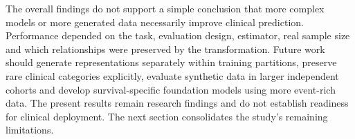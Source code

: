The overall findings do not support a simple conclusion that more complex
models or more generated data necessarily improve clinical prediction.
Performance depended on the task, evaluation design, estimator, real sample
size and which relationships were preserved by the transformation.  Future
work should generate representations separately within training partitions,
preserve rare clinical categories explicitly, evaluate synthetic data in larger
independent cohorts and develop survival-specific foundation models using more
event-rich data.  The present results remain research findings and do not
establish readiness for clinical deployment.  The next section consolidates
the study's remaining limitations.

\FloatBarrier
